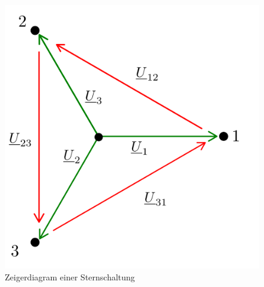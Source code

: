 \begin{enumerate}[label=\alph*)]
\begin{figure}[h!]
\begin{center}
\begin{minipage}[ct]{0.4\linewidth}
\begin{center}
					      \includegraphics[width=\linewidth]{img/2.2.1.2.png}
				      \end{center}
				      \caption{Zeigerdiagram einer Sternschaltung}\label{img/2.2.1.2}
			      \end{minipage}
		      \end{center}
	      \end{figure}




\end{enumerate}
